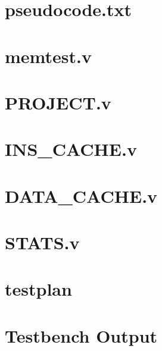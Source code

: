 \documentclass{article}
\begin{document}
\newenvironment{frcseries}{\fontfamily{frc}\selectfont}{}
\newcommand{\textfrc}[1]{{\frcseries#1}}
\newcommand{\mathfrc}[1]{\text{\textfrc{#1}}}

\section{pseudocode.txt}

\newpage

\section{memtest.v}

\newpage 

\section{PROJECT.v}

\newpage 

\section{INS\_CACHE.v}

\newpage 

\section{DATA\_CACHE.v}

\newpage 

\section{STATS.v}

\newpage 


\section{testplan}

\newpage 

\section{Testbench Output}

\end{document}

